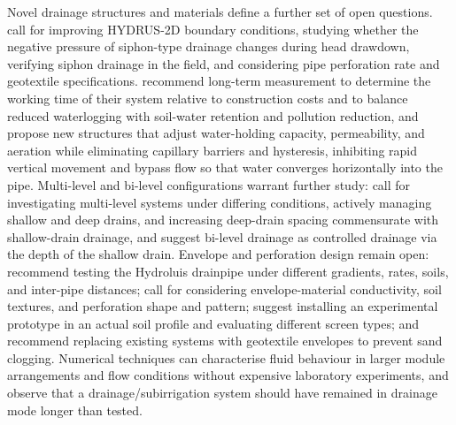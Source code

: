 \documentclass[11pt]{article}
\begin{document}
Novel drainage structures and materials define a further set of open
questions. \textcite{Ren2023} call for improving HYDRUS-2D boundary
conditions, studying whether the negative pressure of siphon-type drainage
changes during head drawdown, verifying siphon drainage in the field, and
considering pipe perforation rate and geotextile specifications.
\textcite{Tao2025b} recommend long-term measurement to determine the working
time of their system relative to construction costs and to balance reduced
waterlogging with soil-water retention and pollution reduction, and
\textcite{Li2021} propose new structures that adjust water-holding capacity,
permeability, and aeration while eliminating capillary barriers and hysteresis,
inhibiting rapid vertical movement and bypass flow so that water converges
horizontally into the pipe. Multi-level and bi-level configurations warrant
further study: \textcite{Hornbuckle2007} call for investigating multi-level
systems under differing conditions, actively managing shallow and deep drains,
and increasing deep-drain spacing commensurate with shallow-drain drainage,
and \textcite{Verma1998} suggest bi-level drainage as controlled drainage via
the depth of the shallow drain. Envelope and perforation design remain open:
\textcite{Alavi2021} recommend testing the Hydroluis drainpipe under different
gradients, rates, soils, and inter-pipe distances; \textcite{Wu2022} call for
considering envelope-material conductivity, soil textures, and perforation
shape and pattern; \textcite{Oyarce2017} suggest installing an experimental
prototype in an actual soil profile and evaluating different screen types; and
\textcite{HajAmor2019} recommend replacing existing systems with geotextile
envelopes to prevent sand clogging. Numerical techniques can characterise fluid behaviour in larger module
arrangements and flow conditions without expensive laboratory experiments, and
\textcite{Nelson2011b} observe that a drainage/subirrigation system should have
remained in drainage mode longer than tested.
\end{document}
